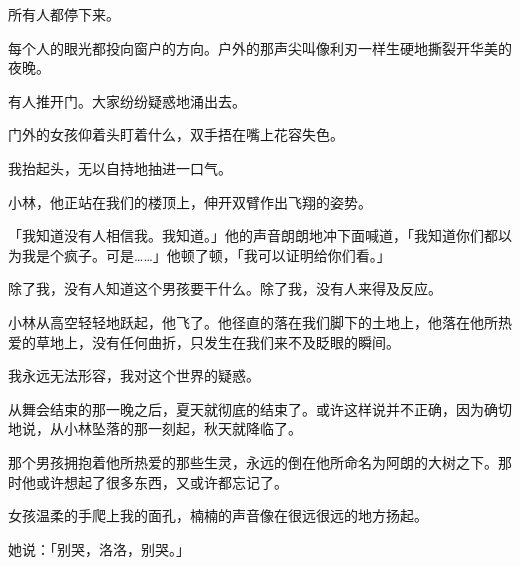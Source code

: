 \documentclass[UTF8]{ctexart}
\begin{document}
所有人都停下来。

每个人的眼光都投向窗户的方向。户外的那声尖叫像利刃一样生硬地撕裂开华美的夜晚。

有人推开门。大家纷纷疑惑地涌出去。

门外的女孩仰着头盯着什么，双手捂在嘴上花容失色。

我抬起头，无以自持地抽进一口气。

小林，他正站在我们的楼顶上，伸开双臂作出飞翔的姿势。

「我知道没有人相信我。我知道。」他的声音朗朗地冲下面喊道，「我知道你们都以为我是个疯子。可是……」他顿了顿，「我可以证明给你们看。」

除了我，没有人知道这个男孩要干什么。除了我，没有人来得及反应。

小林从高空轻轻地跃起，他飞了。他径直的落在我们脚下的土地上，他落在他所热爱的草地上，没有任何曲折，只发生在我们来不及眨眼的瞬间。

我永远无法形容，我对这个世界的疑惑。

从舞会结束的那一晚之后，夏天就彻底的结束了。或许这样说并不正确，因为确切地说，从小林坠落的那一刻起，秋天就降临了。

那个男孩拥抱着他所热爱的那些生灵，永远的倒在他所命名为阿朗的大树之下。那时他或许想起了很多东西，又或许都忘记了。

女孩温柔的手爬上我的面孔，楠楠的声音像在很远很远的地方扬起。

她说：「别哭，洛洛，别哭。」
　
\end{document}
